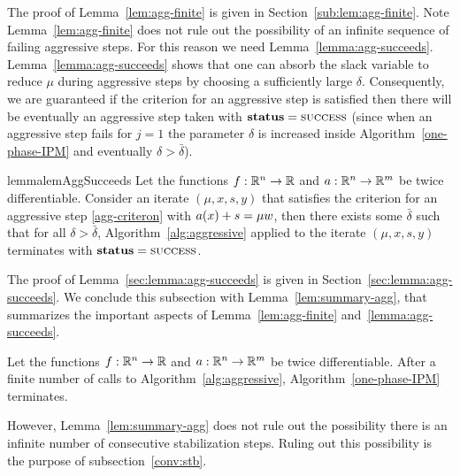 \documentclass{article}
\begin{document}
The proof of Lemma~\ref{lem:agg-finite} is given in Section~\ref{sub:lem:agg-finite}. Note Lemma~\ref{lem:agg-finite} does not rule out the possibility of an infinite sequence of failing aggressive steps. For this reason we need Lemma~\ref{lemma:agg-succeeds}. Lemma~\ref{lemma:agg-succeeds} shows that one can absorb the slack variable to reduce $\mu$ during aggressive steps by choosing a sufficiently large $\delta$. Consequently, we are guaranteed if the criterion for an aggressive step is satisfied then there will be eventually an aggressive step taken with $\textbf{status} = \textsc{success}$ (since when an aggressive step fails for $j=1$ the parameter $\delta$ is increased inside Algorithm~\ref{one-phase-IPM} and eventually $\delta > \bar{\delta}$).

\begin{restatable}{lemma}{lemAggSucceeds}\label{lemma:agg-succeeds}
Let the functions $f : \mathbb{R}^{n} \rightarrow \mathbb{R}$ and $a : \mathbb{R}^{n} \rightarrow \mathbb{R}^{m}$ be twice differentiable. Consider an iterate $(\mu, x, s, y)$ that satisfies the criterion for an aggressive step \eqref{agg-criteron} with $a(x) + s = \mu w$, then there exists some $\bar{\delta}$ such that for all $\delta > \bar{\delta}$, Algorithm~\ref{alg:aggressive} applied to the iterate $(\mu, x, s, y)$ terminates with $\textbf{status} = \textsc{success}$.
\end{restatable}

The proof of Lemma~\ref{sec:lemma:agg-succeeds} is given in Section~\ref{sec:lemma:agg-succeeds}. We conclude this subsection with Lemma~\ref{lem:summary-agg}, that summarizes the important aspects of Lemma~\ref{lem:agg-finite} and~\ref{lemma:agg-succeeds}.

\begin{lemma}\label{lem:summary-agg}
Let the functions $f : \mathbb{R}^{n} \rightarrow \mathbb{R}$ and $a : \mathbb{R}^{n} \rightarrow \mathbb{R}^{m}$ be twice differentiable.
After a finite number of calls to Algorithm~\ref{alg:aggressive}, Algorithm~\ref{one-phase-IPM} terminates.
\end{lemma}

However, Lemma~\ref{lem:summary-agg} does not rule out the possibility there is an infinite number of consecutive stabilization steps. Ruling out this possibility is the purpose of subsection~\ref{conv:stb}.
\end{document}

